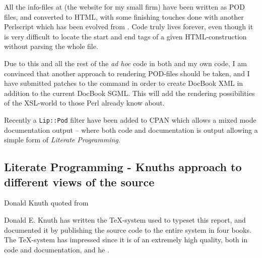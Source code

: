 All the info-files at
 (the
website for my small firm) have been written as POD files,
and converted to HTML, with some finishing touches done with
another Perlscript which has been evolved from
.  Code truly lives forever, even though
it is very difficult to locate the start and end tags of a
given HTML-construction without parsing the whole file.

Due to this and all the rest of the \textit{ad hoc} code in both
 and my own code, I am convinced that another
approach to rendering POD-files should be taken, and I have submitted
patches to the  command in order to create
DocBook XML in addition to the current DocBook SGML.  This will
add the rendering possibilities of the XSL-world to those Perl already
know about.

Recently a \texttt{Lip::Pod} filter have been added to CPAN which
allows a mixed mode documentation output -- where both code
and documentation is output allowing a simple form of \textit{Literate
Programming}.




\subsection{Literate Programming - Knuths approach to different views
  of the source}
\label{sec:literate-programming}

%
{Donald Knuth}%
{\cite{knuthliterateprogramming} quoted from
  }

Donald E. Knuth has written the {\TeX}-system used to typeset this
report, and documented it by publishing the source code to the entire
system in four books.  The {\TeX}-system has impressed since it is of
an extremely high quality, both in code and documentation, and
he .

